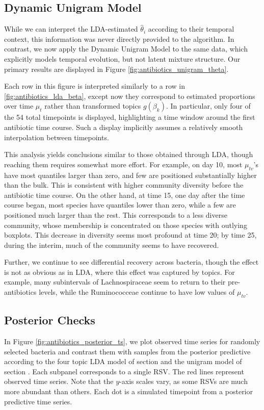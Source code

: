 \documentclass[oupdraft]{bio}
\begin{document}
\subsection{Dynamic Unigram Model}

While we can interpret the LDA-estimated $\hat{\theta}_{i}$ according to their
temporal context, this information was never directly provided to the algorithm.
In contrast, we now apply the Dynamic Unigram Model to the same data, which
explicitly models temporal evolution, but not latent mixture structure. Our
primary results are displayed in Figure \ref{fig:antibiotics_unigram_theta}.

Each row in this figure is interpreted similarly to a row in
\ref{fig:antibiotics_lda_beta}, except now they correspond to estimated
proportions over time $\mu_{t}$ rather than transformed topics
$g\left(\beta_{k}\right)$. In particular, only four of the 54 total timepoints
is displayed, highlighting a time window around the first antibiotic time
course. Such a display implicitly assumes a relatively smooth interpolation
between timepoints.

This analysis yields conclusions similar to those obtained through LDA, though
reaching them requires somewhat more effort. For example, on day 10, most
$\mu_{tv}$'s have most quantiles larger than zero, and few are positioned
substantially higher than the bulk. This is consistent with higher community
diversity before the antibiotic time course. On the other hand, at time 15, one
day after the time course began, most species have quantiles lower than zero,
while a few are positioned much larger than the rest. This corresponds to a less
diverse community, whose membership is concentrated on those species with
outlying boxplots. This decrease in diversity seems most profound at time 20; by
time 25, during the interim, much of the community seems to have recovered.

Further, we continue to see differential recovery across bacteria, though the
effect is not as obvious as in LDA, where this effect was captured by topics.
For example, many subintervals of Lachnospiraceae seem to return to their
pre-antibiotics levels, while the Ruminococceae continue to have low values of
$\mu_{tv}$.

\subsection{Posterior Checks}

In Figure \ref{fig:antibiotics_posterior_ts}, we plot observed time series for
randomly selected bacteria and contrast them with samples from the posterior
predictive according to the four topic LDA model of
section \label{sec:antibiotics_lda} and the unigram model of
section \label{sec:antibiotics_unigram}. Each subpanel corresponds to a single
RSV. The red lines represent observed time series. Note that the $y$-axis scales
vary, as some RSVs are much more abundant than others. Each dot is a simulated
timepoint from a posterior predictive time series.
\end{document}
